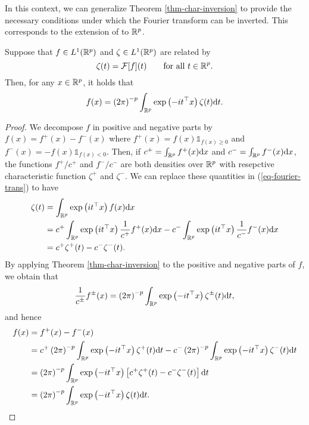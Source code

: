 In this context, we can generalize Theorem \ref{thm-char-inversion} to provide the necessary conditions under which the Fourier transform can be inverted. This corresponds to the extension of \cite[Corollary 2.4.3]{kolassa2006series} to ${\mathbb{R}^p}$.

\begin{corollary} \label{corr-fourier-inv}
    Suppose that $f \in L^1({\mathbb{R}^p})$ and $\zeta \in L^1({\mathbb{R}^p})$ are related by
    \begin{equation}\label{eq-fourier-trans}
        \zeta(t) = \mathcal{F}[f](t) \ \ \ \ \ \ {\textrm{for all }} t \in {\mathbb{R}^p}.
    \end{equation}
    Then, for any $x \in {\mathbb{R}^p}$, it holds that
    \begin{equation} \label{eq-fourier-inv}
        f(x) = \left(2\pi\right)^{-p}\int_{\mathbb{R}^p} \exp\left(-i t^\top x\right) \zeta(t) \text{d} t.
    \end{equation}
\end{corollary}

\begin{proof}
    We decompose $f$ in positive and negative parts by $f(x) = f^+(x) - f^-(x)$ where $f^+(x) = f(x) \mathbb{1}_{f(x) \geq 0}$ and $f^-(x) = -f(x) \mathbb{1}_{f(x) < 0}$. Then, if $c^+ = \int_{\mathbb{R}^p} f^+(x) \text{d} x$ and $c^- = \int_{\mathbb{R}^p} f^-(x) \text{d} x$, the functions $f^+ / c^+$ and $f^- / c^-$ are both densities over ${\mathbb{R}^p}$ with resepctive characteristic function $\zeta^+$ and $\zeta^-$. We can replace these quantities in (\ref{eq-fourier-trans}) to have
    \begin{align*}
        \zeta(t) 
        &= \int_{\mathbb{R}^p} \exp\left(it^\top x\right)f(x)\text{d} x \\
        &= c^+ \int_{\mathbb{R}^p} \exp\left(it^\top x\right) \frac{1}{c^+}f^+(x)\text{d} x - c^- \int_{\mathbb{R}^p} \exp\left(it^\top x\right) \frac{1}{c^-}f^-(x)\text{d} x\\
        &= c^+ \zeta^+(t) - c^-\zeta^-(t).
    \end{align*}
    By applying Theorem \ref{thm-char-inversion} to the positive and negative parts of $f$, we obtain that
    \begin{equation*}
        \frac{1}{c^\pm} f^\pm(x) = \left(2\pi\right)^{-p}\int_{\mathbb{R}^p} \exp\left(-i t^\top x\right) \zeta^\pm(t) \text{d} t,
    \end{equation*}
    and hence
    \begin{align*}
        f(x) 
        &= f^+(x) - f^-(x) \\
        &= c^+ \left(2\pi\right)^{-p}\int_{\mathbb{R}^p} \exp\left(-i t^\top x\right) \zeta^+(t) \text{d} t
         - c^- \left(2\pi\right)^{-p}\int_{\mathbb{R}^p} \exp\left(-i t^\top x\right) \zeta^-(t) \text{d} t \\
        &= \left(2\pi\right)^{-p}\int_{\mathbb{R}^p} \exp\left(-i t^\top x\right) \left[ c^+\zeta^+(t) - c^-\zeta^-(t)\right] \text{d} t\\
        &= \left(2\pi\right)^{-p}\int_{\mathbb{R}^p} \exp\left(-i t^\top x\right) \zeta(t) \text{d} t. \qedhere
    \end{align*}
\end{proof}

